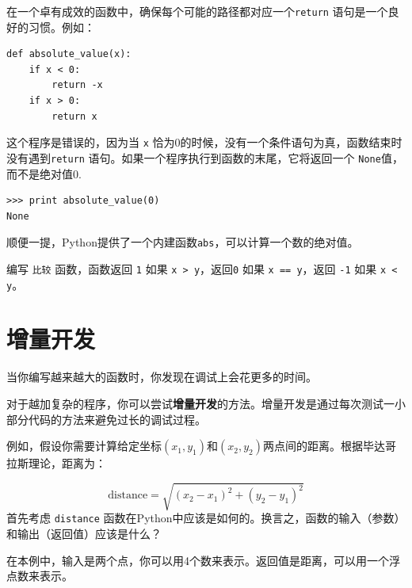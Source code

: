 
在一个卓有成效的函数中，确保每个可能的路径都对应一个{\tt return} 语句是一个良好的习惯。例如：

\beforeverb
\begin{verbatim}
def absolute_value(x):
    if x < 0:
        return -x
    if x > 0:
        return x
\end{verbatim}
\afterverb
%
这个程序是错误的，因为当 {\tt x} 恰为0的时候，没有一个条件语句为真，函数结束时没有遇到{\tt return} 语句。如果一个程序执行到函数的末尾，它将返回一个 {\tt None}值，而不是绝对值0.


\beforeverb
\begin{verbatim}
>>> print absolute_value(0)
None
\end{verbatim}
\afterverb
%
顺便一提，Python提供了一个内建函数{\tt abs}，可以计算一个数的绝对值。


\begin{ex}


编写 {\tt 比较} 函数，函数返回 {\tt 1} 如果 {\tt x > y}，返回{\tt 0} 如果 {\tt x == y}，返回 {\tt -1} 如果 {\tt x < y}。
\end{ex}


\section{增量开发}
\label{增量开发}

当你编写越来越大的函数时，你发现在调试上会花更多的时间。

对于越加复杂的程序，你可以尝试{\bf 增量开发}的方法。增量开发是通过每次测试一小部分代码的方法来避免过长的调试过程。


例如，假设你需要计算给定坐标$(x_1, y_1)$和$(x_2, y_2)$两点间的距离。根据毕达哥拉斯理论，距离为：

\begin{displaymath}
\mathrm{distance} = \sqrt{(x_2 - x_1)^2 + (y_2 - y_1)^2}
\end{displaymath}
%
首先考虑 {\tt distance} 函数在Python中应该是如何的。换言之，函数的输入（参数）和输出（返回值）应该是什么？

在本例中，输入是两个点，你可以用4个数来表示。返回值是距离，可以用一个浮点数来表示。

